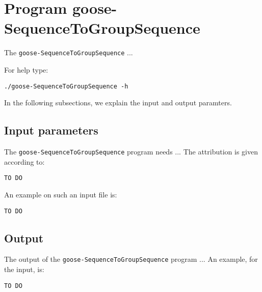 \section{Program goose-SequenceToGroupSequence}
The \texttt{goose-SequenceToGroupSequence} ...

For help type:
\begin{lstlisting}
./goose-SequenceToGroupSequence -h
\end{lstlisting}
In the following subsections, we explain the input and output paramters.

\subsection{Input parameters}

The \texttt{goose-SequenceToGroupSequence} program needs ...
The attribution is given according to:
\begin{lstlisting}
TO DO
\end{lstlisting}

An example on such an input file is:
\begin{lstlisting}
TO DO
\end{lstlisting}

\subsection{Output}
The output of the \texttt{goose-SequenceToGroupSequence} program ...
An example, for the input, is:
\begin{lstlisting}
TO DO
\end{lstlisting}
